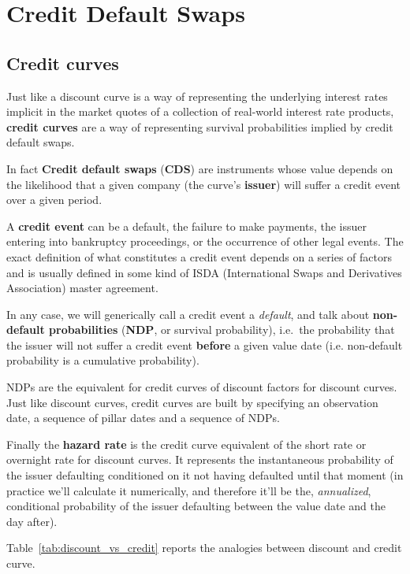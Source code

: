 \chapter{Credit Default Swaps}\label{credit_default_swaps}

\section{Credit curves}\label{credit-curves}

Just like a discount curve is a way of representing the underlying interest rates implicit in the market quotes of a collection of real-world interest rate products, \textbf{credit curves} are a way of representing survival probabilities implied by credit default swaps.

In fact \textbf{Credit default swaps} (\textbf{CDS}) are instruments whose value depends on the likelihood that a given company (the curve's \textbf{issuer}) will suffer a credit event over a given period.

A \textbf{credit event} can be a default, the failure to make payments, the issuer entering into bankruptcy proceedings, or the occurrence of other legal events. The exact definition of what constitutes a credit event depends on a series of factors and is usually defined in some kind of ISDA (International Swaps and Derivatives Association) master agreement.

In any case, we will generically call a credit event a \emph{default}, and talk about \textbf{non-default probabilities} (\textbf{NDP}, or survival probability), i.e.~the probability that the issuer will not suffer a credit event \textbf{before} a given value date (i.e. non-default probability is a cumulative probability).

NDPs are the equivalent for credit curves of discount factors for discount curves. Just like discount curves, credit curves are built by specifying an observation date, a sequence of pillar dates and a sequence of NDPs. 

Finally the \textbf{hazard rate} is the credit curve equivalent of the short rate or overnight rate for discount curves. It represents the instantaneous probability of the issuer defaulting conditioned on it not having defaulted until that moment (in practice we'll calculate it numerically, and therefore it'll be the, \emph{annualized}, conditional probability of the issuer defaulting between the value date and the day after).

Table~\ref{tab:discount_vs_credit} reports the analogies between discount and credit curve.

